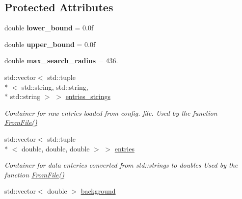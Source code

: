\subsection*{Protected Attributes}
\begin{DoxyCompactItemize}
\item 
\hypertarget{class_mode_track_aa9b7a628197e5929e76a6bd9b7481650}{double {\bfseries lower\-\_\-bound} = 0.\-0f}\label{class_mode_track_aa9b7a628197e5929e76a6bd9b7481650}

\item 
\hypertarget{class_mode_track_aa26bb53ca89328131bd15be63db392b4}{double {\bfseries upper\-\_\-bound} = 0.\-0f}\label{class_mode_track_aa26bb53ca89328131bd15be63db392b4}

\item 
\hypertarget{class_mode_track_ac042e73bed483d080e48246d55318fa6}{double {\bfseries max\-\_\-search\-\_\-radius} = 436.}\label{class_mode_track_ac042e73bed483d080e48246d55318fa6}

\item 
\hypertarget{class_mode_track_a6acf61e6f22fdda9a696013b13b30304}{std\-::vector$<$ std\-::tuple\\*
$<$ std\-::string, std\-::string, \\*
std\-::string $>$ $>$ \hyperlink{class_mode_track_a6acf61e6f22fdda9a696013b13b30304}{entries\-\_\-strings}}\label{class_mode_track_a6acf61e6f22fdda9a696013b13b30304}

\begin{DoxyCompactList}\small\item\em Container for raw entries loaded from config. file. Used by the function \hyperlink{class_mode_track_a53130b8d183a69b14d2ef47666d09385}{From\-File()} \end{DoxyCompactList}\item 
\hypertarget{class_mode_track_a1e854bd28c396015e5d723c05b638450}{std\-::vector$<$ std\-::tuple\\*
$<$ double, double, double $>$ $>$ \hyperlink{class_mode_track_a1e854bd28c396015e5d723c05b638450}{entries}}\label{class_mode_track_a1e854bd28c396015e5d723c05b638450}

\begin{DoxyCompactList}\small\item\em Container for data enteries converted from std\-::strings to doubles Used by the function \hyperlink{class_mode_track_a53130b8d183a69b14d2ef47666d09385}{From\-File()} \end{DoxyCompactList}\item 
\hypertarget{class_mode_track_a02671d29adcf46f88c611194b7351f0b}{std\-::vector$<$ double $>$ \hyperlink{class_mode_track_a02671d29adcf46f88c611194b7351f0b}{background}}\label{class_mode_track_a02671d29adcf46f88c611194b7351f0b}


\end{DoxyCompactItemize}
